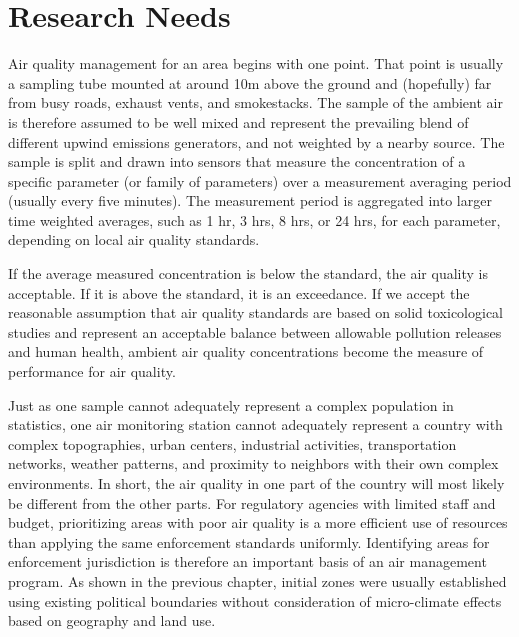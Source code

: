 \section{Research Needs}

Air quality management for an area begins with one point. That point is usually a sampling tube mounted at around 10m above the ground and (hopefully) far from busy roads, exhaust vents, and smokestacks. The sample of the ambient air is therefore assumed to be well mixed and represent the prevailing blend of different upwind emissions generators, and not weighted by a nearby source. The sample is split and drawn into sensors that measure the concentration of a specific parameter (or family of parameters) over a measurement averaging period (usually every five minutes). The measurement period is aggregated into larger time weighted averages, such as 1 hr, 3 hrs, 8 hrs, or 24 hrs, for each parameter, depending on local air quality standards. 

If the average measured concentration is below the standard, the air quality is acceptable. If it is above the standard, it is an exceedance. If we accept the reasonable assumption that air quality standards are based on solid toxicological studies and represent an acceptable balance between allowable pollution releases and human health, ambient air quality concentrations become the measure of performance for air quality.

Just as one sample cannot adequately represent a complex population in statistics, one air monitoring station cannot adequately represent a country with complex topographies, urban centers, industrial activities, transportation networks, weather patterns, and proximity to neighbors with their own complex environments.  In short, the air quality in one part of the country will most likely be different from the other parts. For regulatory agencies with limited staff and budget, prioritizing areas with poor air quality is a more efficient use of resources than applying the same enforcement standards uniformly. Identifying areas for enforcement jurisdiction is therefore an important basis of an air management program. As shown in the previous chapter, initial zones were usually established using existing political boundaries without consideration of micro-climate effects based on geography and land use.  

